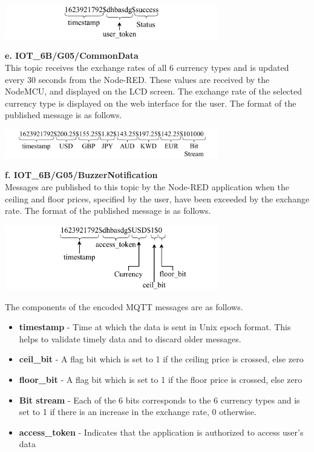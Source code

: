 \begin{center}
\includegraphics[width=0.7\textwidth]{images/userneedsres.pdf}
\end{center}


\textbf{e. IOT\_6B/G05/CommonData} \\

This topic  receives the exchange rates of all 6 currency types and is updated every 30 seconds from the Node-RED. These values are received by the NodeMCU, and displayed on the LCD screen. The exchange rate of the selected currency type is displayed on the web interface for the user. The format of the published message is as follows.

\begin{center}
\includegraphics[width=0.7\textwidth]{images/commondata.pdf}
\end{center}

\textbf{f. IOT\_6B/G05/BuzzerNotification} \\

Messages are published to this topic by the Node-RED application when the ceiling and floor prices, specified by the user, have been exceeded by the exchange rate. The format of the published message is as follows.

\begin{center}
\includegraphics[width=0.7\textwidth]{images/buzzernot.pdf}
\end{center}

The components of the encoded MQTT messages are as follows.

\begin{itemize}[itemsep=-1.7mm]

\item \textbf{timestamp} - Time at which the data is sent in Unix epoch format. This helps to validate timely data and to discard older messages.
\item \textbf{ceil\_bit} - A flag bit which is set to 1 if the ceiling price is crossed, else zero
\item \textbf{floor\_bit} - A flag bit which is set to 1 if the floor price is crossed, else zero
\item \textbf{Bit stream} - Each of the 6 bits corresponds to the 6 currency types and is set to 1 if there is an increase in the exchange rate, 0 otherwise.
\item \textbf{access\_token} - Indicates that the application is authorized to access user’s data \cite{token}

\end{itemize}


